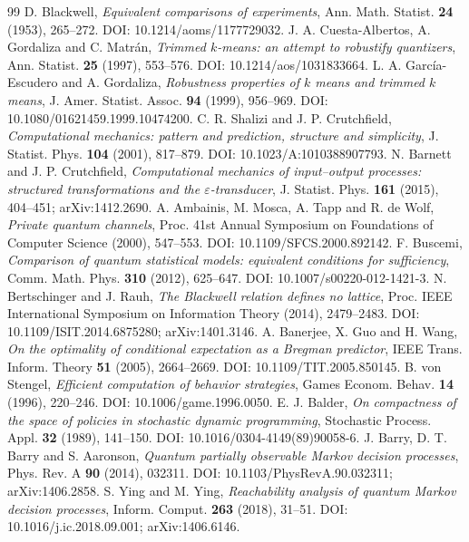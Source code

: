 \begin{thebibliography}{99}
 D. Blackwell, \emph{Equivalent comparisons of experiments}, Ann. Math. Statist. \textbf{24} (1953), 265--272. DOI: 10.1214/aoms/1177729032.
 J. A. Cuesta-Albertos, A. Gordaliza and C. Matr\'an, \emph{Trimmed $k$-means: an attempt to robustify quantizers}, Ann. Statist. \textbf{25} (1997), 553--576. DOI: 10.1214/aos/1031833664.
 L. A. Garc\'ia-Escudero and A. Gordaliza, \emph{Robustness properties of $k$ means and trimmed $k$ means}, J. Amer. Statist. Assoc. \textbf{94} (1999), 956--969. DOI: 10.1080/01621459.1999.10474200.
 C. R. Shalizi and J. P. Crutchfield, \emph{Computational mechanics: pattern and prediction, structure and simplicity}, J. Statist. Phys. \textbf{104} (2001), 817--879. DOI: 10.1023/A:1010388907793.
 N. Barnett and J. P. Crutchfield, \emph{Computational mechanics of input--output processes: structured transformations and the $\varepsilon$-transducer}, J. Statist. Phys. \textbf{161} (2015), 404--451; arXiv:1412.2690.
 A. Ambainis, M. Mosca, A. Tapp and R. de Wolf, \emph{Private quantum channels}, Proc. 41st Annual Symposium on Foundations of Computer Science (2000), 547--553. DOI: 10.1109/SFCS.2000.892142.
 F. Buscemi, \emph{Comparison of quantum statistical models: equivalent conditions for sufficiency}, Comm. Math. Phys. \textbf{310} (2012), 625--647. DOI: 10.1007/s00220-012-1421-3.
 N. Bertschinger and J. Rauh, \emph{The Blackwell relation defines no lattice}, Proc. IEEE International Symposium on Information Theory (2014), 2479--2483. DOI: 10.1109/ISIT.2014.6875280; arXiv:1401.3146.
 A. Banerjee, X. Guo and H. Wang, \emph{On the optimality of conditional expectation as a Bregman predictor}, IEEE Trans. Inform. Theory \textbf{51} (2005), 2664--2669. DOI: 10.1109/TIT.2005.850145.
 B. von Stengel, \emph{Efficient computation of behavior strategies}, Games Econom. Behav. \textbf{14} (1996), 220--246. DOI: 10.1006/game.1996.0050.
 E. J. Balder, \emph{On compactness of the space of policies in stochastic dynamic programming}, Stochastic Process. Appl. \textbf{32} (1989), 141--150. DOI: 10.1016/0304-4149(89)90058-6.
 J. Barry, D. T. Barry and S. Aaronson, \emph{Quantum partially observable Markov decision processes}, Phys. Rev. A \textbf{90} (2014), 032311. DOI: 10.1103/PhysRevA.90.032311; arXiv:1406.2858.
 S. Ying and M. Ying, \emph{Reachability analysis of quantum Markov decision processes}, Inform. Comput. \textbf{263} (2018), 31--51. DOI: 10.1016/j.ic.2018.09.001; arXiv:1406.6146.

\end{thebibliography}
